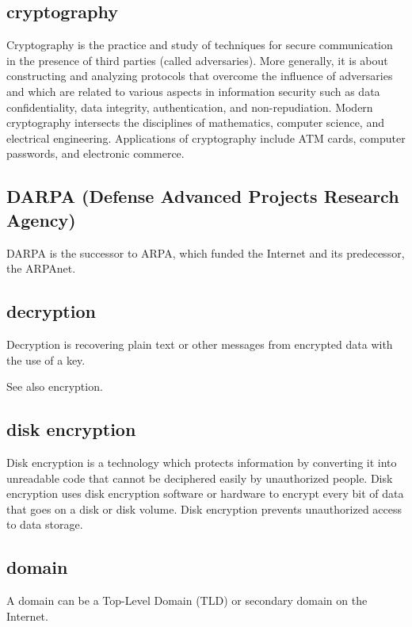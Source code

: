 \subsection{cryptography}

Cryptography is the practice and study of techniques for secure
communication in the presence of third parties (called adversaries).
More generally, it is about constructing and analyzing protocols that
overcome the influence of adversaries and which are related to various
aspects in information security such as data confidentiality, data
integrity, authentication, and non-repudiation. Modern cryptography
intersects the disciplines of mathematics, computer science, and
electrical engineering. Applications of cryptography include ATM cards,
computer passwords, and electronic commerce.

\subsection{DARPA (Defense Advanced Projects Research Agency)}

DARPA is the successor to ARPA, which funded the Internet and its
predecessor, the ARPAnet.

\subsection{decryption}

Decryption is recovering plain text or other messages from encrypted
data with the use of a key.

See also encryption.

\subsection{disk encryption}

Disk encryption is a technology which protects information by converting
it into unreadable code that cannot be deciphered easily by unauthorized
people. Disk encryption uses disk encryption software or hardware to
encrypt every bit of data that goes on a disk or disk volume. Disk
encryption prevents unauthorized access to data storage.

\subsection{domain}

A domain can be a Top-Level Domain (TLD) or secondary domain on the
Internet.

